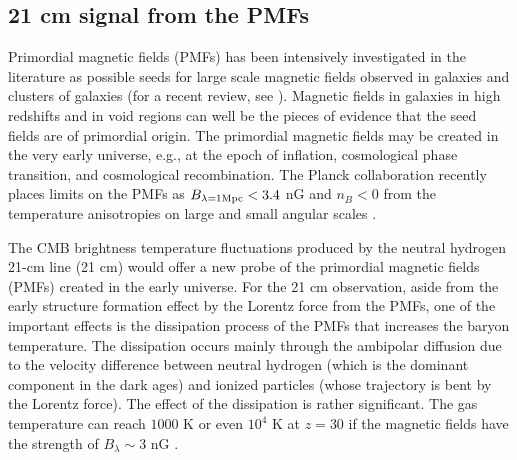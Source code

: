 \documentclass{PoS}
\begin{document}
\subsection{21 cm signal from the PMFs}

Primordial magnetic fields (PMFs) has been intensively investigated in
the literature as possible seeds for large scale magnetic fields
observed in galaxies and clusters of galaxies (for a recent review, see
\citep{2013A&ARv..21...62D}).  Magnetic fields in galaxies in high
redshifts \citep{2008Natur.454..302B} and in void regions
\citep{2010Sci...328...73N,2010ApJ...722L..39A,2013ApJ...771L..42T} can
well be the pieces of evidence that the seed fields are of primordial
origin.  The primordial magnetic fields may be created in the very
early universe, e.g., at the epoch of inflation, cosmological phase
transition, and cosmological recombination.  
The Planck collaboration
recently places limits on the PMFs as $B_{\lambda=1{\rm Mpc}} < 3.4$ nG and $n_B<0$
from the temperature anisotropies on large and small angular scales
\citep{2013arXiv1303.5076P}. 

The CMB brightness temperature fluctuations produced by the neutral
hydrogen 21-cm line (21 cm) would offer a new probe of the primordial
magnetic fields (PMFs) created in the early universe. For the 21 cm
observation, aside from the early structure formation effect by the
Lorentz force from the PMFs, one of the important effects is the
dissipation process of the PMFs that increases the baryon
temperature. The dissipation occurs mainly through the ambipolar
diffusion due to the velocity difference between neutral hydrogen (which
is the dominant component in the dark ages) and ionized particles (whose
trajectory is bent by the Lorentz force).  The effect of the dissipation
is rather significant. The gas temperature can reach $1000$ K or even
$10^4$ K at $z=30$ if the magnetic fields have the strength of
$B_\lambda \sim 3$ nG
\citep{2005MNRAS.356..778S,2006MNRAS.372.1060T,2009ApJ...692..236S,2014JCAP...01..009K}.
\end{document}
